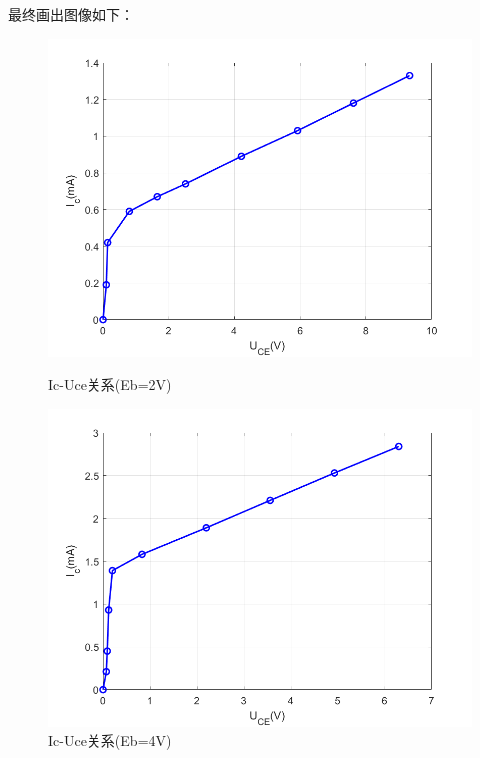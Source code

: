 \documentclass[10pt, a4paper]{article} %
\begin{document}
\newpage
最终画出图像如下：

\begin{figure}[ht]
    \centering
    \begin{minipage}[ht]{0.48\linewidth}
        \centering
        \includegraphics[width=\linewidth]{image/3.png}
        \caption{Ic-Uce关系(Eb=2V)}
        \label{c}
    \end{minipage}
    \hfill
    \begin{minipage}[ht]{0.48\linewidth}
        \centering
        \includegraphics[width=\linewidth]{image/4.png}
        \caption{Ic-Uce关系(Eb=4V)}
        \label{d}
    \end{minipage}
\end{figure}
\end{document}
